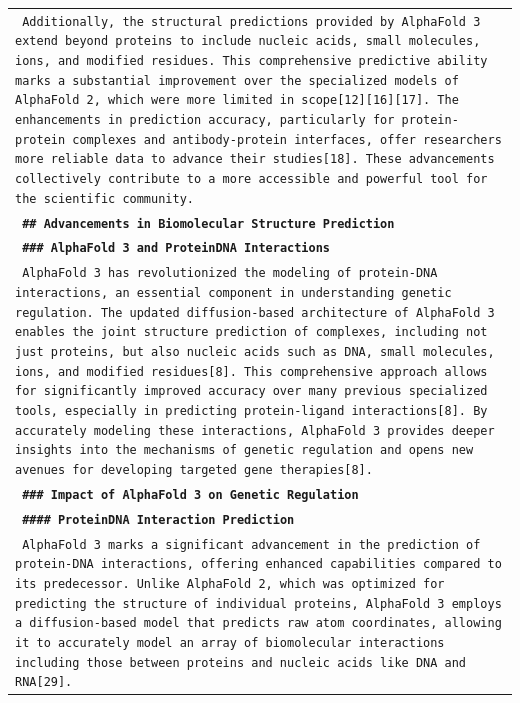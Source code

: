 \begin{longtable}{p{\textwidth}}
\texttt{\small{ Additionally, the structural predictions provided by AlphaFold 3 extend beyond proteins to include nucleic acids, small molecules, ions, and modified residues. This comprehensive predictive ability marks a substantial improvement over the specialized models of AlphaFold 2, which were more limited in scope[12][16][17]. The enhancements in prediction accuracy, particularly for protein-protein complexes and antibody-protein interfaces, offer researchers more reliable data to advance their studies[18]. These advancements collectively contribute to a more accessible and powerful tool for the scientific community. }} \\
\vspace{1pt}
\texttt{\small{\textbf{ \#\# Advancements in Biomolecular Structure Prediction }}} \\
\vspace{1pt}
\texttt{\small{\textbf{ \#\#\# AlphaFold 3 and ProteinDNA Interactions }}} \\
\texttt{\small{ AlphaFold 3 has revolutionized the modeling of protein-DNA interactions, an essential component in understanding genetic regulation. The updated diffusion-based architecture of AlphaFold 3 enables the joint structure prediction of complexes, including not just proteins, but also nucleic acids such as DNA, small molecules, ions, and modified residues[8]. This comprehensive approach allows for significantly improved accuracy over many previous specialized tools, especially in predicting protein-ligand interactions[8]. By accurately modeling these interactions, AlphaFold 3 provides deeper insights into the mechanisms of genetic regulation and opens new avenues for developing targeted gene therapies[8]. }} \\
\vspace{1pt}
\texttt{\small{\textbf{ \#\#\# Impact of AlphaFold 3 on Genetic Regulation }}} \\
\vspace{1pt}
\texttt{\small{\textbf{ \#\#\#\# ProteinDNA Interaction Prediction }}} \\
\texttt{\small{ AlphaFold 3 marks a significant advancement in the prediction of protein-DNA interactions, offering enhanced capabilities compared to its predecessor. Unlike AlphaFold 2, which was optimized for predicting the structure of individual proteins, AlphaFold 3 employs a diffusion-based model that predicts raw atom coordinates, allowing it to accurately model an array of biomolecular interactions including those between proteins and nucleic acids like DNA and RNA[29]. }} \\

\end{longtable}
